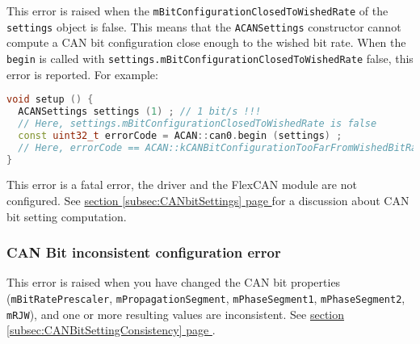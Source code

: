 \documentclass[10pt, a4paper, obeyspaces, openany]{extarticle}
\newcommand\refSubsectionPage[1]{\hyperref[subsec:#1]{section \ref*{subsec:#1} page \pageref{subsec:#1}}}
\newcommand \subsubsectionLabel[2]{\subsubsection{#1}\label{subsubsec:#2}}
\begin{document}
This error is raised when the \texttt{mBitConfigurationClosedToWishedRate} of the \texttt{settings} object is false. This means that the \texttt{ACANSettings} constructor cannot compute a CAN bit configuration close enough to the wished bit rate. When the \texttt{begin} is called with \texttt{settings.mBitConfigurationClosedToWishedRate} false, this error is reported. For example:

{ \small\begin{lstlisting}[language=c++]
void setup () {
  ACANSettings settings (1) ; // 1 bit/s !!!
  // Here, settings.mBitConfigurationClosedToWishedRate is false
  const uint32_t errorCode = ACAN::can0.begin (settings) ;
  // Here, errorCode == ACAN::kCANBitConfigurationTooFarFromWishedBitRateErrorMask
}
\end{lstlisting}}

This error is a fatal error, the driver and the FlexCAN module are not configured. See \refSubsectionPage{CANbitSettings} for a discussion about CAN bit setting computation.


\subsubsectionLabel{CAN Bit inconsistent configuration error}{CANBitInconsistentConfigError}

This error is raised when you have changed the CAN bit properties (\texttt{mBitRatePrescaler}, \texttt{mPropagationSegment}, \texttt{mPhaseSegment1}, \texttt{mPhaseSegment2}, \texttt{mRJW}), and one or more resulting values are inconsistent. See \refSubsectionPage{CANBitSettingConsistency}.
\end{document}
